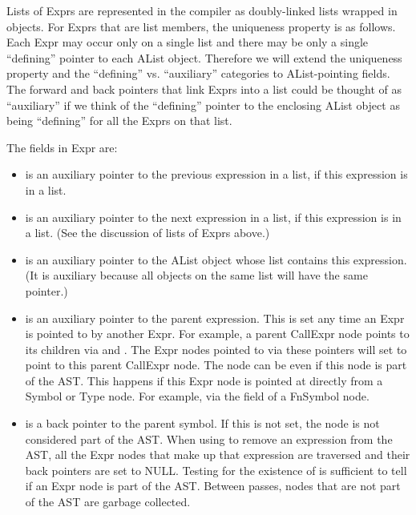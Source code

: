 \documentclass[10pt]{article}
\begin{document}
Lists of Exprs are represented in the compiler as doubly-linked lists
wrapped in  objects.  For Exprs that are list members, the
uniqueness property is as follows.  Each Expr may occur only on a
single list and there may be only a single ``defining'' pointer to
each AList object.  Therefore we will extend the uniqueness property
and the ``defining'' vs. ``auxiliary'' categories to AList-pointing
fields.  The forward and back pointers that link Exprs into a list
could be thought of as ``auxiliary'' if we think of the ``defining''
pointer to the enclosing AList object as being ``defining'' for all
the Exprs on that list.

The fields in Expr are:
\begin{itemize}
\item {} is an auxiliary pointer to the previous expression in
  a list, if this expression is in a list.
\item {} is an auxiliary pointer to the next expression in a list,
  if this expression is in a list. (See the discussion of lists of Exprs above.)
\item {} is an auxiliary pointer to the AList object
  whose list contains this expression.  (It is auxiliary because all
  objects on the same list will have the same  pointer.)
\item {} is an auxiliary pointer to the parent
  expression.  This is set any time an Expr is pointed to by another
  Expr.  For example, a parent CallExpr node points to its children
  via  and .  The Expr nodes pointed to via
  these pointers will set  to point to this parent
  CallExpr node.  The  node can be  even if
  this node is part of the AST.  This happens if this Expr node is
  pointed at directly from a Symbol or Type node.  For example, via
  the  field of a FnSymbol node.
\item {} is a back pointer to the parent
  symbol.  If this is not set, the node is not considered part of the
  AST.  When using  to remove an expression from the AST,
  all the Expr nodes that make up that expression are traversed and
  their  back pointers are set to NULL.  Testing for
  the existence of  is sufficient to tell if an Expr
  node is part of the AST.  Between passes, nodes that are not part of
  the AST are garbage collected.
\end{itemize}
\end{document}
